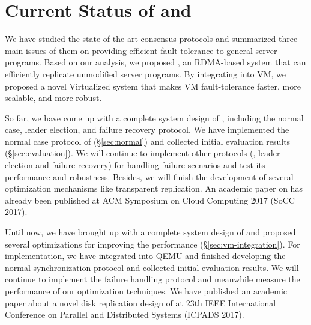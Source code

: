 \section{Current Status of \xxx and \yyy} \label{sec:status}
We have studied the state-of-the-art consensus protocols and summarized 
three main issues of them on providing efficient fault tolerance to 
general server programs. Based on our analysis, we proposed \xxx, an RDMA-based 
\paxos system that can efficiently replicate unmodified server programs.
By integrating \xxx into VM, we proposed a novel Virtualized \smr 
system \yyy that makes VM fault-tolerance faster, more scalable, and 
more robust.

So far, we have come up with a complete system design of \xxx, including the 
normal case, leader election, and failure recovery protocol. We have 
implemented the normal case protocol of \xxx (\S\ref{sec:normal}) and collected 
initial evaluation results (\S\ref{sec:evaluation}). We will continue to 
implement other protocols (\ie, leader election and failure recovery) for 
handling failure scenarios and test its performance and robustness. Besides, we 
will finish the development of several optimization mechanisms like transparent 
replication. An academic paper on \xxx has already been published 
at ACM Symposium on Cloud Computing 2017 (SoCC 2017).

Until now, we have brought up with a complete system design of \yyy and 
proposed several optimizations for improving the 
performance (\S\ref{sec:vm-integration}). For implementation, we have integrated 
\xxx into \kvm QEMU and finished developing the normal synchronization protocol 
and collected initial evaluation results. We will continue to implement the 
failure handling protocol and meanwhile measure the performance of our 
optimization techniques. We have published an academic paper about a novel disk 
replication design of \yyy at 23th IEEE International Conference on Parallel 
and Distributed Systems (ICPADS 2017).